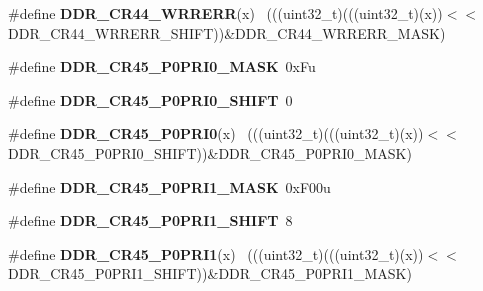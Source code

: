 \begin{DoxyCompactItemize}
\item 
\hypertarget{group___d_d_r___register___masks_ga9fbb36e4e2b7539847fc2123494864c9}{}\#define {\bfseries D\+D\+R\+\_\+\+C\+R44\+\_\+\+W\+R\+R\+E\+R\+R}(x)                                          ~(((uint32\+\_\+t)(((uint32\+\_\+t)(x))$<$$<$D\+D\+R\+\_\+\+C\+R44\+\_\+\+W\+R\+R\+E\+R\+R\+\_\+\+S\+H\+I\+F\+T))\&D\+D\+R\+\_\+\+C\+R44\+\_\+\+W\+R\+R\+E\+R\+R\+\_\+\+M\+A\+S\+K)\label{group___d_d_r___register___masks_ga9fbb36e4e2b7539847fc2123494864c9}

\item 
\hypertarget{group___d_d_r___register___masks_gaaca4ab2d62dd9d5740d0060923e0a33c}{}\#define {\bfseries D\+D\+R\+\_\+\+C\+R45\+\_\+\+P0\+P\+R\+I0\+\_\+\+M\+A\+S\+K}~0x\+Fu\label{group___d_d_r___register___masks_gaaca4ab2d62dd9d5740d0060923e0a33c}

\item 
\hypertarget{group___d_d_r___register___masks_gafbdb2b1a6c80d4a9ea5c0f7e48e0c677}{}\#define {\bfseries D\+D\+R\+\_\+\+C\+R45\+\_\+\+P0\+P\+R\+I0\+\_\+\+S\+H\+I\+F\+T}~0\label{group___d_d_r___register___masks_gafbdb2b1a6c80d4a9ea5c0f7e48e0c677}

\item 
\hypertarget{group___d_d_r___register___masks_gad5b59200403cc8785af9f85f5b6d0501}{}\#define {\bfseries D\+D\+R\+\_\+\+C\+R45\+\_\+\+P0\+P\+R\+I0}(x)                                          ~(((uint32\+\_\+t)(((uint32\+\_\+t)(x))$<$$<$D\+D\+R\+\_\+\+C\+R45\+\_\+\+P0\+P\+R\+I0\+\_\+\+S\+H\+I\+F\+T))\&D\+D\+R\+\_\+\+C\+R45\+\_\+\+P0\+P\+R\+I0\+\_\+\+M\+A\+S\+K)\label{group___d_d_r___register___masks_gad5b59200403cc8785af9f85f5b6d0501}

\item 
\hypertarget{group___d_d_r___register___masks_gace36a2c23258928765f641f5ed42c2ec}{}\#define {\bfseries D\+D\+R\+\_\+\+C\+R45\+\_\+\+P0\+P\+R\+I1\+\_\+\+M\+A\+S\+K}~0x\+F00u\label{group___d_d_r___register___masks_gace36a2c23258928765f641f5ed42c2ec}

\item 
\hypertarget{group___d_d_r___register___masks_ga36b6b53cb6a07c234e647169250193f3}{}\#define {\bfseries D\+D\+R\+\_\+\+C\+R45\+\_\+\+P0\+P\+R\+I1\+\_\+\+S\+H\+I\+F\+T}~8\label{group___d_d_r___register___masks_ga36b6b53cb6a07c234e647169250193f3}

\item 
\hypertarget{group___d_d_r___register___masks_gafe0990d5179416889dd09466e15edbb3}{}\#define {\bfseries D\+D\+R\+\_\+\+C\+R45\+\_\+\+P0\+P\+R\+I1}(x)                                          ~(((uint32\+\_\+t)(((uint32\+\_\+t)(x))$<$$<$D\+D\+R\+\_\+\+C\+R45\+\_\+\+P0\+P\+R\+I1\+\_\+\+S\+H\+I\+F\+T))\&D\+D\+R\+\_\+\+C\+R45\+\_\+\+P0\+P\+R\+I1\+\_\+\+M\+A\+S\+K)\label{group___d_d_r___register___masks_gafe0990d5179416889dd09466e15edbb3}


\end{DoxyCompactItemize}
